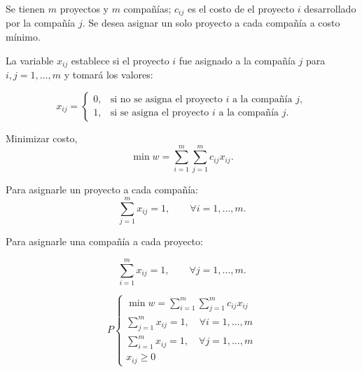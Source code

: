 \begin{Ejem} Se tienen $m$ proyectos y $m$ compa\~n\'ias; $c_{ij}$ es el costo de el proyecto $i$ desarrollado por la compa\~n\'ia $j$. Se desea asignar un solo proyecto a cada compa\~n\'ia a costo m\'inimo.

\begin{tcolorbox}[title=Variables de decisi\'on.] La variable $x_{ij}$ establece si el proyecto $i$ fue asignado a la compa\~n\'ia $j$ para $i,j=1,\dots,m$ y tomar\'a los valores:

\[
x_{ij}=
\begin{cases}
0, & \text{si no se asigna el proyecto } i \text{ a la compa\~n\'ia } j,\\
1, & \text{si se asigna el proyecto } i \text{ a la compa\~n\'ia } j.
\end{cases}
\]
\end{tcolorbox}

\begin{tcolorbox}[title=Funci\'on objetivo.] Minimizar costo,
\[
\min w = \sum_{i=1}^{m}\sum_{j=1}^{m} c_{ij}x_{ij}.
\]
\end{tcolorbox}

\begin{tcolorbox}[title=Restricciones. ] 

Para asignarle un proyecto a cada compa\~n\'ia:
\[
\sum_{j=1}^{m} x_{ij} = 1, \qquad \forall i=1,\dots,m.
\]

Para asignarle una compa\~n\'ia a cada proyecto:

\[
\sum_{i=1}^{m} x_{ij} = 1, \qquad \forall j=1,\dots,m.
\]
\end{tcolorbox}

\begin{tcolorbox}[title=El problema de asignaci\'on es el siguiente:]

\[
P
\begin{cases}
\min w = \sum_{i=1}^{m}\sum_{j=1}^{m} c_{ij}x_{ij}\\
\sum_{j=1}^{m} x_{ij} = 1, \quad \forall i=1,\dots,m\\
\sum_{i=1}^{m} x_{ij} = 1, \quad \forall j=1,\dots,m\\
x_{ij} \ge 0
\end{cases}
\]
\end{tcolorbox}


\end{Ejem}

